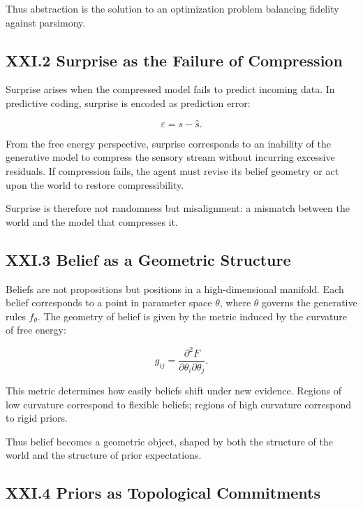 \documentclass[11pt,letterpaper]{article}
\begin{document}
Thus abstraction is the solution to an optimization problem balancing fidelity against parsimony.

\subsection{XXI.2 Surprise as the Failure of Compression}

Surprise arises when the compressed model fails to predict incoming data. In predictive coding, surprise is encoded as prediction error:

\[
\varepsilon = s - \hat{s}.
\]

From the free energy perspective, surprise corresponds to an inability of the generative model to compress the sensory stream without incurring excessive residuals. If compression fails, the agent must revise its belief geometry or act upon the world to restore compressibility.

Surprise is therefore not randomness but misalignment: a mismatch between the world and the model that compresses it.

\subsection{XXI.3 Belief as a Geometric Structure}

Beliefs are not propositions but positions in a high-dimensional manifold. Each belief corresponds to a point in parameter space \(\theta\), where \(\theta\) governs the generative rules \(f_\theta\). The geometry of belief is given by the metric induced by the curvature of free energy:

\[
g_{ij} = \frac{\partial^2 F}{\partial \theta_i \partial \theta_j}.
\]

This metric determines how easily beliefs shift under new evidence. Regions of low curvature correspond to flexible beliefs; regions of high curvature correspond to rigid priors.

Thus belief becomes a geometric object, shaped by both the structure of the world and the structure of prior expectations.

\subsection{XXI.4 Priors as Topological Commitments}
\end{document}
